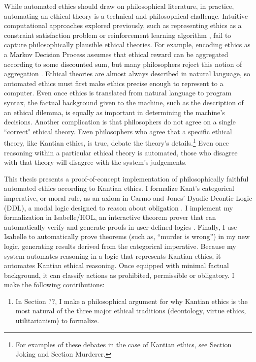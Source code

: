 \begin{isabellebody}
\begin{isamarkuptext}
While automated ethics should draw on philosophical literature, in practice, automating an ethical 
theory is a technical and philosophical challenge. Intuitive computational approaches explored 
previously, such as representing ethics as a constraint satisfaction problem \citep{csp} or reinforcement 
learning algorithm \citep{util1}, fail to capture philosophically plausible ethical theories. For 
example, encoding ethics as a Markov Decision Process assumes that ethical reward can be aggregated 
according to some discounted sum, but many philosophers reject this notion of aggregation \citep{consequentialismsep}. 
Ethical theories are almost always described in natural language, so automated ethics must first 
make ethics precise enough to represent to a computer. Even once ethics is translated from natural 
language to program syntax, the factual background given to the machine, such as the description of 
an ethical dilemma, is equally as important in determining the machine's decisions. Another complication
is that philosophers do not agree on a single ``correct" ethical theory. Even philosophers who
agree that a specific ethical theory, like Kantian ethics, is true, debate the theory's 
details.\footnote{For examples of these debates in the case of Kantian ethics, see Section Joking
and Section Murderer.} Even once reasoning within a 
particular ethical theory is automated, those who disagree with that theory will disagree with the 
system's judgements.

This thesis presents a proof-of-concept implementation of philosophically faithful automated ethics
according to Kantian ethics. I formalize Kant's categorical imperative, or moral rule, as an axiom 
in Carmo and Jones' Dyadic Deontic Logic (DDL), a modal logic designed to reason about 
obligation \citep{CJDDL}. I implement my formalization in Isabelle/HOL, an interactive theorem prover 
that can automatically verify and generate proofs in user-defined logics \citep{isabelle}. Finally, 
I use Isabelle to automatically prove theorems (such as, ``murder is wrong'') in my new logic, 
generating results derived from the categorical imperative. Because my system automates reasoning in 
a logic that represents Kantian ethics, it automates Kantian ethical reasoning. Once equipped with 
minimal factual background, it can classify actions as prohibited, permissible or obligatory. I 
make the following contributions:%
\end{isamarkuptext}\isamarkuptrue%
%
\begin{isamarkuptext}%
\begin{enumerate}
\item In Section ??, I make a philosophical argument for why Kantian ethics is the most natural of the three major
ethical traditions (deontology, virtue ethics, utilitarianism) to formalize.


\end{enumerate}
\end{isamarkuptext}
\end{isabellebody}
